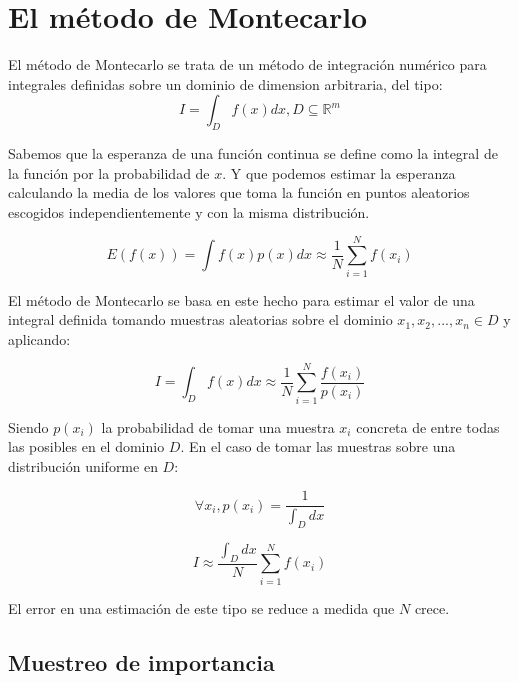 \clearpage

\section{El método de Montecarlo}

El método de Montecarlo se trata de un método de integración numérico para integrales definidas sobre un dominio de dimension arbitraria, del tipo:
\begin{equation}
I = \int_D f(x)dx , D \subseteq \mathbb{R}^m
\end{equation}

Sabemos que la esperanza de una función continua se define como la integral de la función por la probabilidad de $x$. Y que podemos estimar la esperanza calculando la media de los valores que toma la función en puntos aleatorios escogidos independientemente y con la misma distribución.

\begin{equation}
E(f(x)) = \int f(x)p(x)dx \approx \frac{1}{N} \sum _{i=1} ^N f(x_i) 
\end{equation}


El método de Montecarlo se basa en este hecho para estimar el valor de una integral definida tomando muestras aleatorias sobre el dominio $x_1, x_2, ..., x_n \in D$ y aplicando:

\begin{equation}
\label{eq:montecarlo}
I = \int_D f(x)dx \approx \frac{1}{N} \sum _{i=1} ^N \frac{f(x_i)}{p(x_i)} 
\end{equation}

Siendo $p(x_i)$ la probabilidad de tomar una muestra $x_i$ concreta de entre todas las posibles en el dominio $D$. En el caso de tomar las muestras sobre una distribución uniforme en $D$:

\begin{equation}
\forall x_i, p(x_i) = \frac{1}{\int _D dx}
\end{equation}

\begin{equation}
I \approx \frac{\int _D dx}{N} \sum_{i=1} ^N f(x_i)
\end{equation}

El error en una estimación de este tipo se reduce a medida que $N$ crece.
\clearpage

\subsection{Muestreo de importancia}
    
